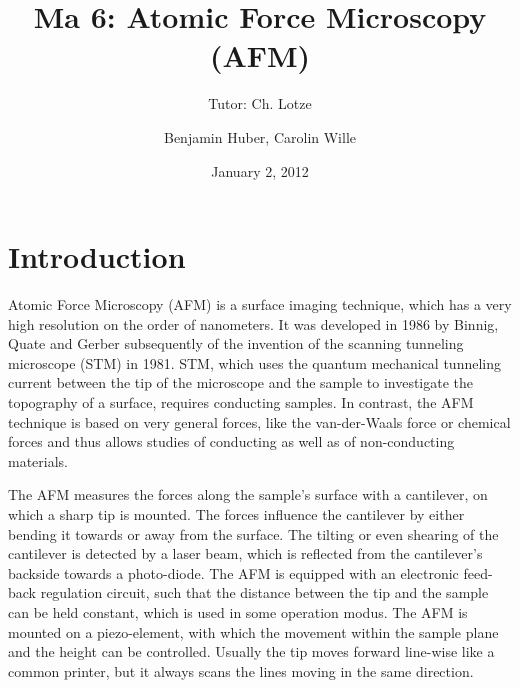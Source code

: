 \documentclass[a4paper]{scrartcl}
\title{Ma 6: Atomic Force Microscopy (AFM)}
\subtitle{Tutor: Ch. Lotze}
\author{Benjamin Huber, Carolin Wille}
\date{January 2, 2012}
\numberwithin{equation}{section}
\numberwithin{figure}{section}
\numberwithin{table}{section}
\begin{document}
\thispagestyle{empty}
\maketitle
\tableofcontents
\clearpage


\section{Introduction}
Atomic Force Microscopy (AFM) is a surface imaging technique, which has a very high resolution on the order of nanometers. It was developed in 1986 by Binnig, Quate and Gerber subsequently of the invention of the scanning tunneling microscope (STM) in 1981. STM, which uses the quantum mechanical tunneling current between the tip of the microscope and the sample to investigate the topography of a surface, requires conducting samples. In contrast, the AFM technique is based on very general forces, like the van-der-Waals force or chemical forces and thus allows studies of conducting as well as of non-conducting materials.

The AFM measures the forces along the sample's surface with a cantilever, on which a sharp tip is mounted. The forces influence the cantilever by either bending it towards or away from the surface. The tilting or even shearing of the cantilever is detected by a laser beam, which is reflected from the cantilever's backside towards a photo-diode. The AFM is equipped with an electronic feed-back regulation circuit, such that the distance between the tip and the sample can be held constant, which is used in some operation modus. The AFM is mounted on a piezo-element, with which the movement within the sample plane and the height can be controlled. Usually the tip moves forward line-wise like a common printer, but it always scans the lines moving in the same direction.
\end{document}
